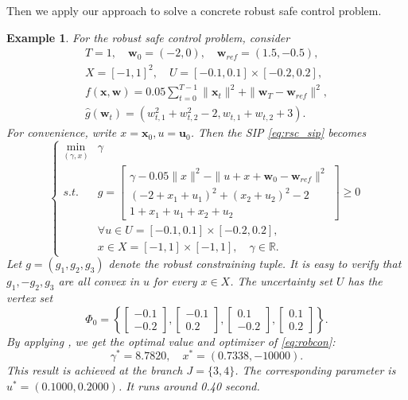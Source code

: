 \documentclass{amsart}
\theoremstyle{plain}
\newtheorem{exmp}[theorem]{Example}
\newcommand{\re}{\mathbb{R}}
\newcommand{\st}{\mathit{s.t.}}
\newcommand{\bbm}{\begin{bmatrix}}
\newcommand{\ebm}{\end{bmatrix}}
\numberwithin{equation}{section}
\begin{document}
    Then we apply our approach to solve a concrete robust safe control problem.
    \begin{exmp}
    For the robust safe control problem, consider 
    \[\begin{array}{l}
    T = 1,\quad \mathbf{w}_0 = (-2,0),\quad \mathbf{w}_{ref} = (1.5,-0.5),\\
    X = [-1,1]^2,\quad U = [-0.1,0.1]\times [-0.2,0.2],\\
     f(\mathbf{x},\mathbf{w}) = 0.05\sum\limits_{t=0}^{T-1} \|\mathbf{x}_t\|^2+\|\mathbf{w}_T-\mathbf{w}_{ref}\|^2,\\
     \hat{g}(\mathbf{w}_t) = (w_{t,1}^2+w_{t,2}^2-2, w_{t,1}+w_{t,2}+3).
    \end{array}\]
     For convenience, write $x = \mathbf{x}_0, u = \mathbf{u}_0$.
    Then the SIP \eqref{eq:rsc_sip} becomes
	\begin{equation}\label{eq:robcon}
		\left\{\begin{array}{cl}
			\min\limits_{(\gamma,x)} & \gamma\\
			\st & g = \bbm \gamma-0.05 \|x\|^2-\|u+x +\mathbf{w}_0- \mathbf{w}_{ref}\|^2\\
			(-2+x_{1}+u_{1})^2+(x_{2}+u_{2})^2-2\\
			1+x_{1}+u_{1}+x_{2}+u_{2}\ebm\ge 0 \\
			&  \forall u\in U = [-0.1,0.1]\times [-0.2,0.2] ,\\
			& x\in X = [-1,1]\times [-1,1],\quad \gamma\in \re.
		\end{array}
		\right.
	\end{equation}
	Let $g = (g_1,g_2,g_3)$ denote the robust constraining tuple. 
	It is easy to verify that $g_1, -g_2, g_3$ are all convex in $u$ for every $x\in X$. 
	The uncertainty set $U$ has the vertex set
	\[ \Phi_0 = \left\{\bbm -0.1\\-0.2\ebm, \left[\begin{array}{r}-0.1\\0.2\end{array}\right], 
	\left[\begin{array}{r}0.1\\-0.2\end{array}\right], \bbm 0.1\\0.2\ebm
	\right\}. \]
	By applying , we get the optimal value and optimizer of \eqref{eq:robcon}:
			\[
			\gamma^* = 8.7820, \quad x^* = (0.7338, -10000).
			\]
			This result is achieved at the branch $J = \{3,4\}$.
			The corresponding parameter is $u^* = (0.1000,0.2000)$.
			It runs around 0.40 second. 	
	\end{exmp}
	
\end{document}
